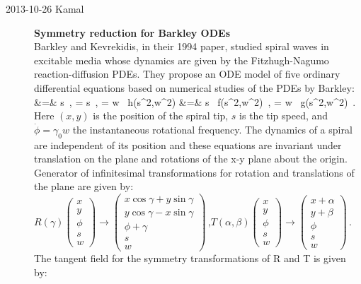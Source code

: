 \begin{description}
\item[2013-10-26 Kamal] \textbf{Symmetry reduction for Barkley ODEs}
\\
Barkley and Kevrekidis, in their 1994 paper, studied
spiral waves in excitable media whose dynamics are given by the
Fitzhugh-Nagumo reaction-diffusion PDEs. They propose an ODE model
 of five ordinary differential equations based on
numerical studies of the PDEs by Barkley:
\bea
{} &=& s \cos{\phi} \,,\qquad
{} = s \sin{\phi}\,,\qquad
\dot{\phi} =  w \, h(s^2,w^2)     \continue
{}  &=& s \, f(s^2,w^2) \,,\qquad
{}= w \, g(s^2,w^2)
\,.
\label{BarKev94-6}
\eea
Here $(x,y)$ is the position of the spiral tip, $s$ is the tip speed, and
$\dot{\phi}= \gamma_0 w$ the instantaneous rotational frequency. The
dynamics of a spiral are independent of its position and these equations are
invariant under translation on the plane and rotations of the x-y plane about the origin.
Generator of infinitesimal transformations for rotation and translations of the plane are given by:
\\
$R({\gamma})
\left(
\begin{array}{c}
x\\y\\\phi\\s\\w
\end{array}
\right) \longrightarrow \left(
\begin{array}{c}
x \cos{\gamma}+y \sin{\gamma}\\
y \cos{\gamma}-x \sin{\gamma}\\
\phi + {\gamma}\\
s\\
w
\end{array}
\right)\,$,\quad $T(\alpha,\beta)
\left(
\begin{array}{c}
x\\
y\\
\phi\\
s\\
w
\end{array}
\right) \longrightarrow \left(
\begin{array}{c}
x +{\alpha} \\
y +{\beta}\\
\phi \\
s\\
w
\end{array} \right)
\,$.
\\
The tangent field for the symmetry transformations of R and T is given by:

\end{description}
